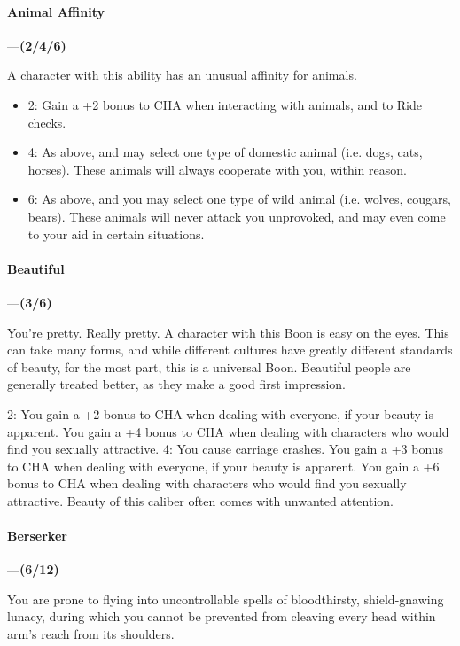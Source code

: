 \documentclass[oneside,11pt,english]{book}
\begin{document}
\paragraph{\label{boon:Animal Affinity}Animal Affinity}\!---\quad \textbf{(2/4/6)}\par
A character with this ability has an unusual affinity for animals. 
\begin{itemize}
	\item 2: Gain a +2 bonus to CHA when interacting with animals, and to Ride checks. 
	\item 4: As above, and may select one type of domestic animal (i.e. dogs, cats, horses). These animals will always cooperate with you, within reason. 
	\item 6: As above, and you may select one type of wild animal (i.e. wolves, cougars, bears). These animals will never attack you unprovoked, and may even come to your aid in certain situations. 
\end{itemize}

\paragraph{\label{boon:Beautiful}Beautiful}---\quad \textbf{(3/6)}\par
You're pretty. Really pretty. A character with this Boon is easy on the eyes. This can take many forms, 
and while different cultures have greatly different standards of beauty, for the most part, this is a universal 
Boon. Beautiful people are generally treated better, as they make a good first impression. 

 

2: You gain a +2 bonus to CHA when dealing with everyone, if your beauty is apparent. You gain a +4 
bonus to CHA when dealing with characters who would find you sexually attractive. 
4: You cause carriage crashes. You gain a +3 bonus to CHA when dealing with everyone, if your beauty 
is apparent. You gain a +6 bonus to CHA when dealing with characters who would find you sexually 
attractive. Beauty of this caliber often comes with unwanted attention. 
\paragraph{\label{boon:Berserker}Berserker}---\quad \textbf{(6/12)}\par
You are prone to flying into uncontrollable spells of bloodthirsty, shield-gnawing lunacy, during which 
you cannot be prevented from cleaving every head within arm's reach from its shoulders. 
\end{document}
